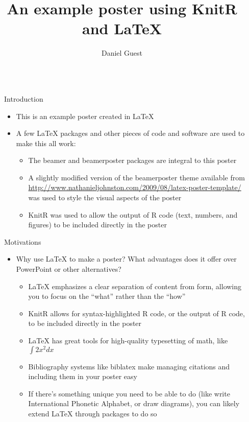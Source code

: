 \documentclass[capfont, final]{beamer}\usepackage[]{graphicx}\usepackage[]{color}
\title{An example poster using KnitR and LaTeX}
\author{Daniel Guest}
\institute{University of Somewhere, Department of Something, One of the Labs}
\newlength{\sepwid}
\newlength{\onecolwid}
\begin{document}
\begin{frame}[t, fragile]
	\begin{columns}[T] %
		\begin{column}{\sepwid}\end{column} %
		\begin{column}{\onecolwid} %
				\begin{block}{Introduction}
						\begin{itemize}
							\item This is an example poster created in \LaTeX{}
							\item A few \LaTeX{} packages and other pieces of code and software are used to make this all work:
							\begin{itemize}
								\item The beamer and beamerposter packages are integral to this poster
								\item A slightly modified version of the beamerposter theme available from \url{http://www.nathanieljohnston.com/2009/08/latex-poster-template/} was used to style the visual aspects of the poster
								\item KnitR was used to allow the output of R code (text, numbers, and figures) to be included directly in the poster
							\end{itemize}
						\end{itemize}
				\end{block}
				\begin{alertblock}{Motivations}
						\begin{itemize}
							\item Why use \LaTeX{} to make a poster? What advantages does it offer over PowerPoint or other alternatives?
								\begin{itemize}
										\item LaTeX{} emphasizes a clear separation of content from form, allowing you to focus on the ``what'' rather than the ``how'' 
										\item KnitR allows for syntax-highlighted R code, or the output of R code, to be included directly in the poster 
										\item LaTeX{} has great tools for high-quality typesetting of math, like $\int 2x^2 dx$
										\item Bibliography systems like biblatex make managing citations and including them in your poster easy
										\item If there's something unique you need to be able to do (like write International Phonetic Alphabet, or draw diagrams), you can likely extend \LaTeX{} through packages to do so

\end{itemize}
\end{itemize}
\end{alertblock}
\end{column}
\end{columns}
\end{frame}
\end{document}

